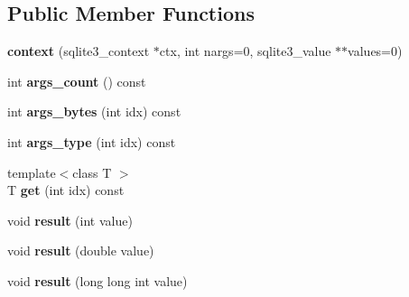 \subsection*{Public Member Functions}
\begin{DoxyCompactItemize}
\item 
\hypertarget{classsqlite3pp_1_1ext_1_1context_a77154187b26ae1e8d7ba201473ff69e9}{{\bfseries context} (sqlite3\-\_\-context $\ast$ctx, int nargs=0, sqlite3\-\_\-value $\ast$$\ast$values=0)}\label{classsqlite3pp_1_1ext_1_1context_a77154187b26ae1e8d7ba201473ff69e9}

\item 
\hypertarget{classsqlite3pp_1_1ext_1_1context_a26bec66b424da39bcb56fbef411eece0}{int {\bfseries args\-\_\-count} () const }\label{classsqlite3pp_1_1ext_1_1context_a26bec66b424da39bcb56fbef411eece0}

\item 
\hypertarget{classsqlite3pp_1_1ext_1_1context_a56b57178738812292492c085eeb762b1}{int {\bfseries args\-\_\-bytes} (int idx) const }\label{classsqlite3pp_1_1ext_1_1context_a56b57178738812292492c085eeb762b1}

\item 
\hypertarget{classsqlite3pp_1_1ext_1_1context_a5f8efbc64463809b39cf300c101937a5}{int {\bfseries args\-\_\-type} (int idx) const }\label{classsqlite3pp_1_1ext_1_1context_a5f8efbc64463809b39cf300c101937a5}

\item 
\hypertarget{classsqlite3pp_1_1ext_1_1context_a7dee5517eabd76630ce46dbc6ee053bb}{{\footnotesize template$<$class T $>$ }\\T {\bfseries get} (int idx) const }\label{classsqlite3pp_1_1ext_1_1context_a7dee5517eabd76630ce46dbc6ee053bb}

\item 
\hypertarget{classsqlite3pp_1_1ext_1_1context_addc69b54f36d40cb302671b7bd8a64dc}{void {\bfseries result} (int value)}\label{classsqlite3pp_1_1ext_1_1context_addc69b54f36d40cb302671b7bd8a64dc}

\item 
\hypertarget{classsqlite3pp_1_1ext_1_1context_a70250ebb8256611efe70e1f0bf4b7364}{void {\bfseries result} (double value)}\label{classsqlite3pp_1_1ext_1_1context_a70250ebb8256611efe70e1f0bf4b7364}

\item 
\hypertarget{classsqlite3pp_1_1ext_1_1context_a75250069330291844e64b422711bbd37}{void {\bfseries result} (long long int value)}\label{classsqlite3pp_1_1ext_1_1context_a75250069330291844e64b422711bbd37}


\end{DoxyCompactItemize}
